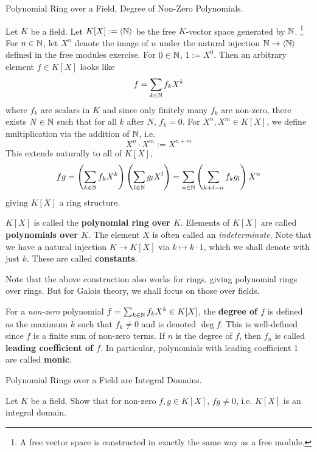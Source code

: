 \documentclass[../book.tex]{subfiles}
\begin{document}
\begin{dfn} Polynomial Ring over a Field, Degree of Non-Zero Polynomials. 

    Let $K$ be a field. 
    Let $K[X] := \langle\mathbb{N}\rangle$ be the free $K$-vector space generated by $\mathbb{N}$.
    \footnote{
    A free vector space is constructed in exactly the same way as a free module.
    } 
    For $n \in \mathbb{N}$, let $X^n$ denote the image of $n$ 
    under the natural injection $\mathbb{N} \to \langle\mathbb{N}\rangle$ 
    defined in the free modules exercise. 
    For $0 \in \mathbb{N}$, $1 := X^0$. 
    Then an arbitrary element $f \in K[X]$ looks like \[
        f = \sum_{k \in \mathbb{N}} f_k X^k
    \]
    where $f_k$ are scalars in $K$ and
    since only finitely many $f_k$ are non-zero,
    there exists $N \in \mathbb{N}$ such that for all $k$ after $N$, $f_k = 0$. 
    For $X^n, X^m \in K[X]$, we define multiplication via the addition of $\mathbb{N}$,
    i.e. \[X^n \cdot X^m := X^{n + m}\]
    This extends naturally to all of $K[X]$, \[
    fg = \left(\sum_{k \in \mathbb{N}} f_k X^k\right)\left(\sum_{l \in \mathbb{N}} g_l X^l\right) 
    = \sum_{n \in \mathbb{N}} \left(\sum_{k + l = n} f_k g_l\right) X^n
    \]
    giving $K[X]$ a ring structure.
    
    $K[X]$ is called the \textbf{polynomial ring over $K$}.
    Elements of $K[X]$ are called \textbf{polynomials over $K$}. 
    The element $X$ is often called an \emph{indeterminate}. 
    Note that we have a natural injection $K \to K[X]$ via $k \mapsto k\cdot 1$,
    which we shall denote with just $k$. 
    These are called \textbf{constants}. 
    
    Note that the above construction also works for rings, 
    giving polynomial rings over rings.
    But for Galois theory, we shall focus on those over fields. 
    
    For a \emph{non-zero} polynomial $f = \sum_{k \in \mathbb{N}} f_k X^k\in K[X]$, 
    the \textbf{degree of $f$} is defined as 
    the maximum $k$ such that $f_k \neq 0$ and is denoted $\deg f$. 
    This is well-defined since $f$ is a finite sum of non-zero terms. 
    If $n$ is the degree of $f$, then $f_n$ is called 
    \textbf{leading coefficient of $f$}. 
    In particular, polynomials with leading coefficient 1 are called \textbf{monic}.
\end{dfn}

\begin{ex} [Important] Polynomial Rings over a Field are Integral Domains. 
    
    Let $K$ be a field. 
    Show that for non-zero $f, g \in K[X]$, $fg \neq 0$,
    i.e. $K[X]$ is an integral domain. 
\end{ex}
\end{document}
